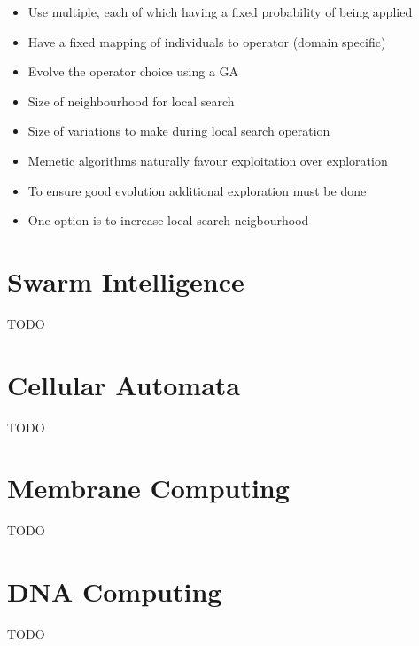 \documentclass[a4paper]{article}
\begin{document}

\begin{itemize}
  \item Use multiple, each of which having a fixed probability of being applied
  \item Have a fixed mapping of individuals to operator (domain specific)
  \item Evolve the operator choice using a GA
\end{itemize}


\begin{itemize}
  \item Size of neighbourhood for local search
  \item Size of variations to make during local search operation
\end{itemize}


\begin{itemize}
  \item Memetic algorithms naturally favour exploitation over exploration
  \item To ensure good evolution additional exploration must be done
  \item One option is to increase local search neigbourhood
\end{itemize}

\section{Swarm Intelligence}
\label{sec:swarm}

TODO

\section{Cellular Automata}
\label{sec:ca}

TODO

\section{Membrane Computing}
\label{sec:membrane}

TODO

\section{DNA Computing}
\label{sec:dna}

TODO
\end{document}
